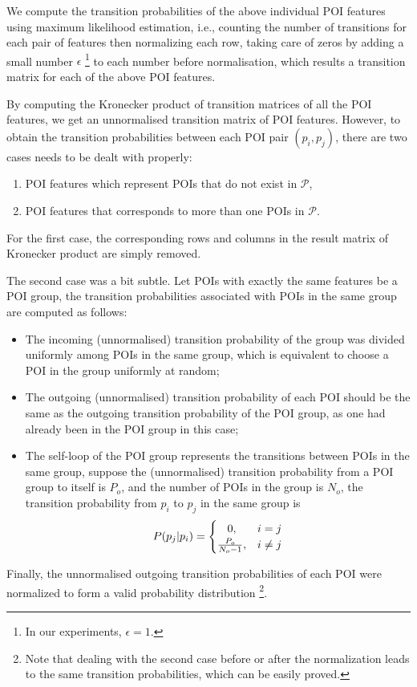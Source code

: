 We compute the transition probabilities of the above individual POI features
using maximum likelihood estimation,
i.e., counting the number of transitions for each pair of features then normalizing each row,
taking care of zeros by adding a small number $\epsilon$
\footnote{In our experiments, $\epsilon = 1$.}
to each number before normalisation,
which results a transition matrix for each of the above POI features.

By computing the Kronecker product of transition matrices of all the POI features,
we get an unnormalised transition matrix of POI features.
However, to obtain the transition probabilities between each POI pair $(p_i, p_j)$,
there are two cases needs to be dealt with properly:
\begin{enumerate}
\item POI features which represent POIs that do not exist in $\mathcal{P}$,
\item POI features that corresponds to more than one POIs in $\mathcal{P}$.
\end{enumerate}

For the first case,
the corresponding rows and columns in the result matrix of Kronecker product are simply removed.

The second case was a bit subtle.
Let POIs with exactly the same features be a POI group,
the transition probabilities associated with POIs in the same group are computed as follows:
\begin{itemize}
\item The incoming (unnormalised) transition probability of the group was divided uniformly among POIs
      in the same group, which is equivalent to choose a POI in the group uniformly at random;
\item The outgoing (unnormalised) transition probability of each POI should be the same as the
      outgoing transition probability of the POI group, as one had already been in the POI group in this case;
\item The self-loop of the POI group represents the transitions between POIs in the same group,
      suppose the (unnormalised) transition probability from a POI group to itself is $P_o$,
      and the number of POIs in the group is $N_o$,
      the transition probability from $p_i$ to $p_j$ in the same group is
      \begin{displaymath}
          P(p_j | p_i) =
          \begin{cases}
              \hfill 0, \hfill & i = j \\
              \hfill \frac{P_o}{N_o - 1}, \hfill & i \ne j \\
          \end{cases}
      \end{displaymath}
\end{itemize}
Finally, the unnormalised outgoing transition probabilities of each POI were normalized to form
a valid probability distribution
\footnote{Note that dealing with the second case before or after the normalization leads to
the same transition probabilities, which can be easily proved.}.


